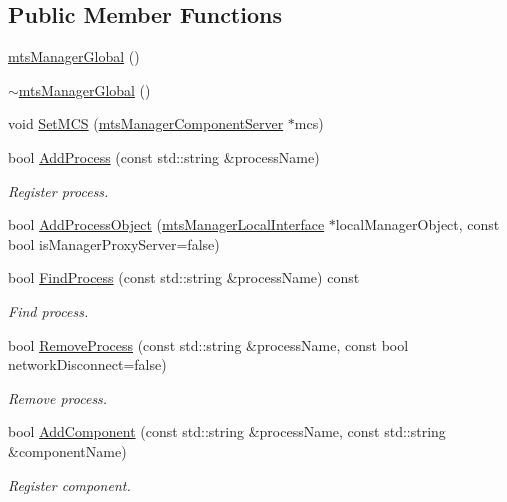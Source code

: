 \subsection*{Public Member Functions}
\begin{DoxyCompactItemize}
\item 
\hyperlink{classmts_manager_global_abd0f3829c71d3e3c1f29fc048d9047be}{mts\+Manager\+Global} ()
\item 
\hyperlink{classmts_manager_global_ac679e410e25ca54006e4893cb4feb9b5}{$\sim$mts\+Manager\+Global} ()
\item 
void \hyperlink{classmts_manager_global_a25180a6b4c13081af290de27cca9dc18}{Set\+M\+C\+S} (\hyperlink{classmts_manager_component_server}{mts\+Manager\+Component\+Server} $\ast$mcs)
\item 
bool \hyperlink{classmts_manager_global_ad2133b03d5c9cad83613cfd9f94b33c4}{Add\+Process} (const std\+::string \&process\+Name)
\begin{DoxyCompactList}\small\item\em Register process. \end{DoxyCompactList}\item 
bool \hyperlink{classmts_manager_global_a16df0096e52ff60e1dadafcde7a75fef}{Add\+Process\+Object} (\hyperlink{classmts_manager_local_interface}{mts\+Manager\+Local\+Interface} $\ast$local\+Manager\+Object, const bool is\+Manager\+Proxy\+Server=false)
\item 
bool \hyperlink{classmts_manager_global_a4a62c2854055d41938a6b8e65c0193da}{Find\+Process} (const std\+::string \&process\+Name) const 
\begin{DoxyCompactList}\small\item\em Find process. \end{DoxyCompactList}\item 
bool \hyperlink{classmts_manager_global_aabe689a2366312fb41e4f559241c34f4}{Remove\+Process} (const std\+::string \&process\+Name, const bool network\+Disconnect=false)
\begin{DoxyCompactList}\small\item\em Remove process. \end{DoxyCompactList}\item 
bool \hyperlink{classmts_manager_global_a7ea69577859e7ee2790adb4bc69c589c}{Add\+Component} (const std\+::string \&process\+Name, const std\+::string \&component\+Name)
\begin{DoxyCompactList}\small\item\em Register component. \end{DoxyCompactList}\item 

\end{DoxyCompactItemize}
